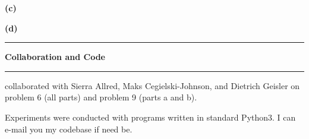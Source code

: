 \documentclass[11pt]{article}
\newcommand\question[2]{\vspace{.25in}\hrule\textbf{#1}\vspace{.5em}\hrule\vspace{.10in}}
\renewcommand\part[1]{\vspace{.10in}\textbf{(#1)}}
\begin{document}

\part{c}  


\part{d} 


\newpage

\question{Collaboration and Code}

I collaborated with Sierra Allred, Maks Cegielski-Johnson, and Dietrich Geisler on problem 6 (all parts) and problem 9 (parts a and b). \newline


Experiments were conducted with programs written in standard Python3. I can e-mail you my codebase if need be.
\end{document}

